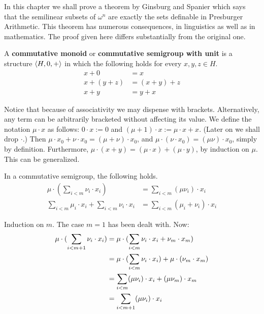 In this chapter we shall prove a theorem by Ginsburg and Spanier 
which says that the semilinear subsets of $\omega^n$ are exactly the 
sets definable in 
Presburger Arithmetic. This theorem has numerous consequences, in 
linguistics as well as in mathematics. The proof given here differs 
substantially from the original one. 
\begin{defn}
A \textbf{commutative monoid} or \textbf{commutative se\-mi\-group 
with unit} is a structure $\langle H, 0, +\rangle$ in which the following 
holds for every $x, y, z \in H$.
\begin{equation}
\label{eq:25commgrp}
\begin{split}
x + 0       & = x \\
x + (y + z) & = (x + y) + z \\
x + y       & = y + x
\end{split}
\end{equation}
\end{defn}
Notice that because of associativity we may dispense with 
brackets. Alternatively, any term can be arbitrarily bracketed 
without affecting its value. We define the notation $\mu \cdot x$ 
as follows: $0 \cdot x := 0$ and $(\mu + 1) \cdot x := \mu \cdot x + x$.
(Later on we shall drop $\cdot$.)
Then $\mu \cdot x_0 + \nu \cdot x_0 = (\mu + \nu) \cdot x_0$, 
and $\mu \cdot (\nu \cdot x_0) = (\mu\nu) \cdot x_0$, simply
by definition. Furthermore, $\mu \cdot (x + y) = 
(\mu \cdot x) + (\mu \cdot y)$, by induction on $\mu$. 
This can be generalized.
\begin{lem}
\label{lem:commgrpgl}
In a commutative semigroup, the following holds. 
\begin{align}
\mu \cdot (\sum_{i < m} \nu_i \cdot x_i) & = 
	\sum_{i < m} (\mu\nu_i) \cdot x_i \\
\sum_{i < m} \mu_i \cdot x_i + \sum_{i < m} \nu_i\cdot  x_i & = 
	\sum_{i < m} (\mu_i + \nu_i) \cdot x_i
\end{align}
\end{lem}
\proofbeg
Induction on $m$. The case $m = 1$ has been dealt with. Now: 
\begin{align}
\mu \cdot (\sum_{i < m+1} \nu_i \cdot x_i) & = 
     \mu \cdot (\sum_{i < m} \nu_i \cdot x_i + \nu_m \cdot x_m) \\\notag
   & = \mu \cdot (\sum_{i < m} \nu_i \cdot x_i) + \mu\cdot (\nu_m \cdot x_m)
\\\notag
   & = \sum_{i < m} (\mu\nu_i) \cdot x_i + (\mu\nu_m) \cdot x_m 
\\\notag 
   & = \sum_{i < m+1} (\mu\nu_i) \cdot x_i 
\end{align}
